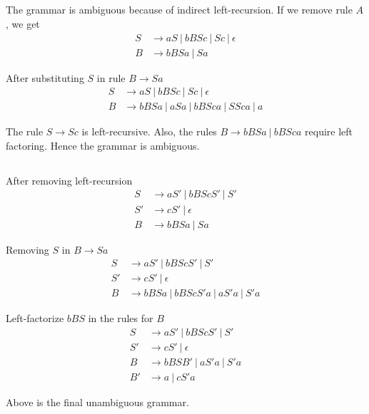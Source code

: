 \documentclass{article}
\begin{document}
\subsection{}
The grammar is ambiguous because of indirect left-recursion. If we remove
rule $A$, we get
\begin{align*}
	S & \rightarrow  aS ~|~ bBSc ~|~ Sc ~|~ \epsilon \\
	B & \rightarrow bBSa ~|~ Sa
\end{align*}

After substituting $S$ in rule $B \rightarrow Sa$
\begin{align*}
	S & \rightarrow  aS ~|~ bBSc ~|~ Sc ~|~ \epsilon      \\
	B & \rightarrow bBSa ~|~ aSa ~|~ bBSca ~|~ SSca ~|~ a
\end{align*}

The rule $S \rightarrow Sc$ is left-recursive. Also, the rules
$B \rightarrow bBSa ~|~ bBSca$ require left factoring. Hence the grammar is ambiguous.

\subsection{}
After removing left-recursion
\begin{align*}
	S  & \rightarrow aS' ~|~ bBScS' ~|~ S' \\
	S' & \rightarrow cS' ~|~ \epsilon      \\
	B  & \rightarrow bBSa ~|~ Sa
\end{align*}

Removing $S$ in $B \rightarrow Sa$
\begin{align*}
	S  & \rightarrow aS' ~|~ bBScS' ~|~ S'             \\
	S' & \rightarrow cS' ~|~ \epsilon                  \\
	B  & \rightarrow bBSa ~|~ bBScS'a ~|~ aS'a ~|~ S'a
\end{align*}

Left-factorize $bBS$ in the rules for $B$
\begin{align*}
	S  & \rightarrow aS' ~|~ bBScS' ~|~ S'  \\
	S' & \rightarrow cS' ~|~ \epsilon       \\
	B  & \rightarrow bBSB' ~|~ aS'a ~|~ S'a \\
	B' & \rightarrow a ~|~ cS'a
\end{align*}

Above is the final unambiguous grammar.
\end{document}
